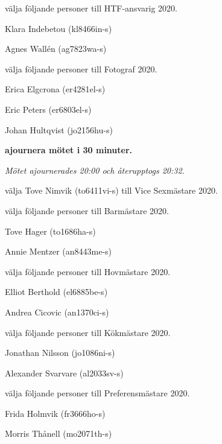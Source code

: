 \documentclass[10pt]{article}
\begin{document}
\begin{paragrafer}
\begin{paralist}

    \Mba välja följande personer till HTF-ansvarig 2020.
    \begin{tightdashlist}
        \item Klara Indebetou (kl8466in-s)
        \item Agnes Wallén (ag7823wa-s)
    \end{tightdashlist}

    \newpage

    \Mba välja följande personer till Fotograf 2020.
    \begin{tightdashlist}
        \item Erica Elgcrona (er4281el-s)
        \item Eric Peters (er6803el-s)
        \item Johan Hultqvist (jo2156hu-s)
    \end{tightdashlist}

    \textbf{\Mba ajournera mötet i 30 minuter.}

    \emph{Mötet ajournerades 20:00 och återupptogs 20:32.}

    \Mba välja Tove Nimvik (to6411vi-s) till Vice Sexmästare 2020.

    \Mba välja följande personer till Barmästare 2020.
    \begin{tightdashlist}
        \item Tove Hager (to1686ha-s)
        \item Annie Mentzer (an8443me-s)
    \end{tightdashlist}

    \Mba välja följande personer till Hovmästare 2020.
    \begin{tightdashlist}
        \item Elliot Berthold (el6885be-s)
        \item Andrea Cicovic (an1370ci-s)
    \end{tightdashlist}

    \Mba välja följande personer till Kökmästare 2020.
    \begin{tightdashlist}
        \item Jonathan Nilsson (jo1086ni-s)
        \item Alexander Svarvare (al2033sv-s)
    \end{tightdashlist}

    \Mba välja följande personer till Preferensmästare 2020. 
    \begin{tightdashlist}
        \item Frida Holmvik (fr3666ho-s)
        \item Morris Thånell (mo2071th-s)
    \end{tightdashlist}


\end{paralist}
\end{paragrafer}
\end{document}
